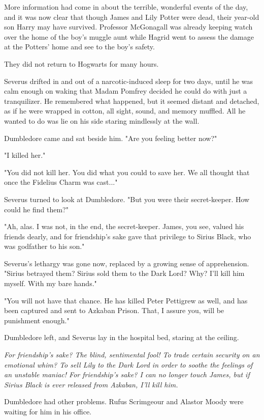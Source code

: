 More information had come in about the terrible, wonderful events of the day, and it was now clear that though James and Lily Potter were dead, their year-old son Harry may have survived. Professor McGonagall was already keeping watch over the home of the boy's muggle aunt while Hagrid went to assess the damage at the Potters' home and see to the boy's safety.

They did not return to Hogwarts for many hours.

Severus drifted in and out of a narcotic-induced sleep for two days, until he was calm enough on waking that Madam Pomfrey decided he could do with just a tranquilizer. He remembered what happened, but it seemed distant and detached, as if he were wrapped in cotton, all sight, sound, and memory muffled. All he wanted to do was lie on his side staring mindlessly at the wall.

Dumbledore came and sat beside him. "Are you feeling better now?"

"I killed her."

"You did not kill her. You did what you could to save her. We all thought that once the Fidelius Charm was cast..."

Severus turned to look at Dumbledore. "But you were their secret-keeper. How could he find them?"

"Ah, alas. I was not, in the end, the secret-keeper. James, you see, valued his friends dearly, and for friendship's sake gave that privilege to Sirius Black, who was godfather to his son."

Severus's lethargy was gone now, replaced by a growing sense of apprehension. "Sirius betrayed them? Sirius sold them to the Dark Lord? Why? I'll kill him myself. With my bare hands."

"You will not have that chance. He has killed Peter Pettigrew as well, and has been captured and sent to Azkaban Prison. That, I assure you, will be punishment enough."

Dumbledore left, and Severus lay in the hospital bed, staring at the ceiling.

\emph{For friendship's sake? The blind, sentimental fool! To trade certain security on an emotional whim? To sell Lily to the Dark Lord in order to soothe the feelings of an unstable maniac! For friendship's sake? I can no longer touch James, but if Sirius Black is ever released from Azkaban, I'll kill him.}

Dumbledore had other problems. Rufus Scrimgeour and Alastor Moody were waiting for him in his office.

